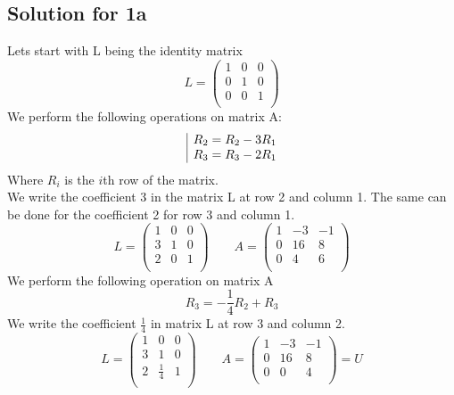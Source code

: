 \documentclass[a4paper,fleqn,12pt]{article}
\begin{document}
\subsection{Solution for 1a}
Lets start with L being the identity matrix
$$
	L = \begin{pmatrix}
	1 & 0 & 0 \\
	0 & 1 & 0 \\
	0 & 0 & 1 \\
	\end{pmatrix}
$$
We perform the following operations on matrix A: 
$$
\begin{array}{|l@{}}
	R_2 = R_2 - 3R_1 \\
	R_3 = R_3 - 2R_1
\end{array}
$$
Where $R_i$ is the $i$th row of the matrix. \\
We write the coefficient 3 in the matrix L at row 2 and column 1. 
The same can be done for the coefficient 2 for row 3 and column 1.
$$
	L = \begin{pmatrix}
	1 & 0 & 0 \\
	3 & 1 & 0 \\
	2 & 0 & 1 \\
	\end{pmatrix} \qquad 
	A = \begin{pmatrix}
	1 & -3 & -1 \\
	0 & 16 & 8 \\
	0 & 4  & 6 \\
	\end{pmatrix}
$$
We perform the following operation on matrix A
$$
R_3 = -\frac{1}{4}R_2 + R_3
$$
We write the coefficient $\frac{1}{4}$ in matrix L at row 3 and column 2.
$$
L = \begin{pmatrix}
	1 & 0 & 0 \\
	3 & 1 & 0 \\
	2 & \frac{1}{4} & 1 \\
	\end{pmatrix} \qquad 
	A = \begin{pmatrix}
	1 & -3 & -1 \\
	0 & 16 & 8 \\
	0 & 0  & 4 \\
	\end{pmatrix} = U
$$
\newpage
\end{document}
